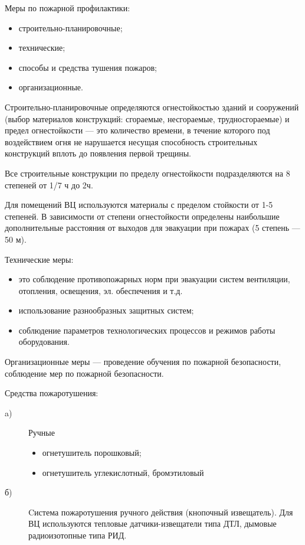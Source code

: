 Меры по пожарной профилактики:
\begin{itemize}
\item строительно-планировочные;
\item технические;
\item способы и средства тушения пожаров;
\item организационные.
\end{itemize}

Строительно-планировочные определяются огнестойкостью зданий и сооружений (выбор материалов конструкций: сгораемые, несгораемые,
трудносгораемые) и предел огнестойкости — это количество времени, в течение которого под воздействием огня не нарушается
несущая способность строительных конструкций вплоть до появления первой трещины.

Все строительные конструкции по пределу огнестойкости подразделяются на 8 степеней от 1/7 ч до 2ч.

Для помещений ВЦ используются материалы с пределом стойкости от 1-5 степеней. В зависимости от степени огнестойкости определены
наибольшие дополнительные расстояния от выходов для эвакуации при пожарах (5 степень — 50 м).

Технические меры:
\begin{itemize}
\item это соблюдение противопожарных норм при эвакуации систем вентиляции, отопления, освещения, эл. обеспечения и т.д.
\item использование разнообразных защитных систем;
\item соблюдение параметров технологических процессов и режимов работы оборудования.
\end{itemize}

Организационные меры — проведение обучения по пожарной безопасности, соблюдение мер по пожарной безопасности.

Средства пожаротушения:
\begin{description}
\item[a)]Ручные
	\begin{itemize}
	\item огнетушитель порошковый;
	\item огнетушитель углекислотный, бромэтиловый
	\end{itemize}

\item[б)] Cистема пожаротушения ручного действия (кнопочный извещатель).
Для ВЦ используются тепловые датчики-извещатели типа ДТЛ, дымовые радиоизотопные типа РИД.
\end{description}

